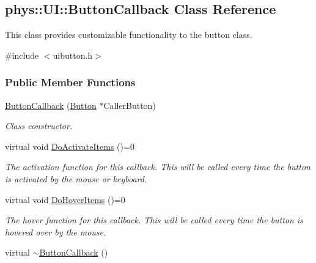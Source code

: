 \hypertarget{classphys_1_1UI_1_1ButtonCallback}{
\subsection{phys::UI::ButtonCallback Class Reference}
\label{classphys_1_1UI_1_1ButtonCallback}
}


This class provides customizable functionality to the button class.  




{\ttfamily \#include $<$uibutton.h$>$}

\subsubsection*{Public Member Functions}
\begin{DoxyCompactItemize}
\item 
\hyperlink{classphys_1_1UI_1_1ButtonCallback_a085db8789d4c712806e22c9040c69f39}{ButtonCallback} (\hyperlink{classphys_1_1UI_1_1Button}{Button} $\ast$CallerButton)
\begin{DoxyCompactList}\small\item\em Class constructor. \item\end{DoxyCompactList}\item 
\hypertarget{classphys_1_1UI_1_1ButtonCallback_a47d5ff1399ac9f4ff586ea5e0c63249f}{
virtual void \hyperlink{classphys_1_1UI_1_1ButtonCallback_a47d5ff1399ac9f4ff586ea5e0c63249f}{DoActivateItems} ()=0}
\label{classphys_1_1UI_1_1ButtonCallback_a47d5ff1399ac9f4ff586ea5e0c63249f}

\begin{DoxyCompactList}\small\item\em The activation function for this callback. This will be called every time the button is activated by the mouse or keyboard. \item\end{DoxyCompactList}\item 
\hypertarget{classphys_1_1UI_1_1ButtonCallback_a0374a47ec705a821ebf51162a7da9a54}{
virtual void \hyperlink{classphys_1_1UI_1_1ButtonCallback_a0374a47ec705a821ebf51162a7da9a54}{DoHoverItems} ()=0}
\label{classphys_1_1UI_1_1ButtonCallback_a0374a47ec705a821ebf51162a7da9a54}

\begin{DoxyCompactList}\small\item\em The hover function for this callback. This will be called every time the button is hovered over by the mouse. \item\end{DoxyCompactList}\item 
\hypertarget{classphys_1_1UI_1_1ButtonCallback_a340fbc3fb86e9183285613f8af5b542e}{
virtual \hyperlink{classphys_1_1UI_1_1ButtonCallback_a340fbc3fb86e9183285613f8af5b542e}{$\sim$ButtonCallback} ()}
\label{classphys_1_1UI_1_1ButtonCallback_a340fbc3fb86e9183285613f8af5b542e}


\end{DoxyCompactItemize}
